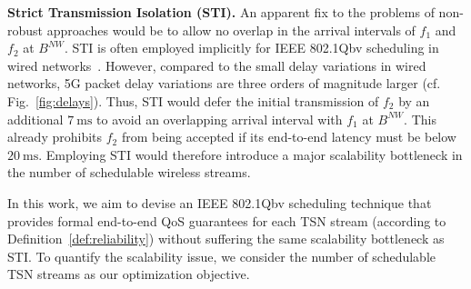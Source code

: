 \textbf{Strict Transmission Isolation (STI).}
An apparent fix to the problems of non-robust approaches would be to allow no overlap in the arrival intervals of $f_1$ and $f_2$ at $B^{NW}$.
STI is often employed implicitly for IEEE 802.1Qbv scheduling in wired networks~\cite{nwps, Craciunas2016RTNS}.
However, compared to the small delay variations in wired networks, 5G packet delay variations are three orders of magnitude larger (cf. Fig.~\ref{fig:delays}).
Thus, STI would defer the initial transmission of $f_2$ by an additional $\qty{7}{\ms}$ to avoid an overlapping arrival interval with $f_1$ at $B^{NW}$.
This already prohibits $f_2$ from being accepted if its end-to-end latency must be below $\qty{20}{\ms}$.
Employing STI would therefore introduce a major scalability bottleneck in the number of schedulable wireless streams.

In this work, we aim to devise an IEEE 802.1Qbv scheduling technique that provides formal end-to-end QoS guarantees for each TSN stream (according to Definition~\ref{def:reliability}) without suffering the same scalability bottleneck as STI.
To quantify the scalability issue, we consider the number of schedulable TSN streams as our optimization objective.
